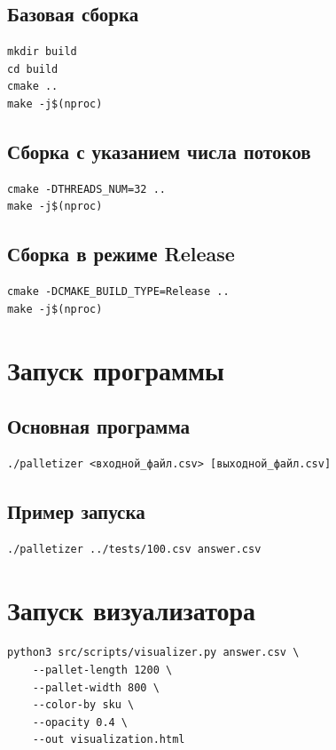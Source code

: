 \subsection{Базовая сборка}
\begin{verbatim}
mkdir build
cd build
cmake ..
make -j$(nproc)
\end{verbatim}

\subsection{Сборка с указанием числа потоков}
\begin{verbatim}
cmake -DTHREADS_NUM=32 ..
make -j$(nproc)
\end{verbatim}

\subsection{Сборка в режиме Release}
\begin{verbatim}
cmake -DCMAKE_BUILD_TYPE=Release ..
make -j$(nproc)
\end{verbatim}

\section{Запуск программы}

\subsection{Основная программа}
\begin{verbatim}
./palletizer <входной_файл.csv> [выходной_файл.csv]
\end{verbatim}

\subsection{Пример запуска}
\begin{verbatim}
./palletizer ../tests/100.csv answer.csv
\end{verbatim}

\section{Запуск визуализатора}

\begin{verbatim}
python3 src/scripts/visualizer.py answer.csv \
    --pallet-length 1200 \
    --pallet-width 800 \
    --color-by sku \
    --opacity 0.4 \
    --out visualization.html
\end{verbatim}

